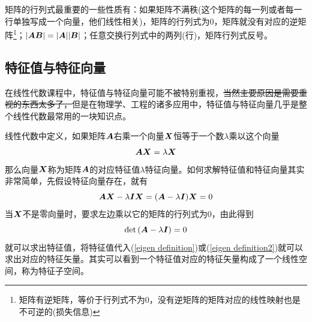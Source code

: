 \documentclass[12pt,a4paper,openany,twoside]{book}
\numberwithin{equation}{section}
\begin{document}
          矩阵的行列式最重要的一些性质有：如果矩阵不满秩(这个矩阵的每一列或者每一行单独写成一个向量，他们线性相关)，矩阵的行列式为0，矩阵就没有对应的逆矩阵\footnote{矩阵有逆矩阵，等价于行列式不为0，没有逆矩阵的矩阵对应的线性映射也是不可逆的(损失信息)}；$\abs{\vb*{A B}}=\abs{\vb*{A}}\abs{\vb*{B}}$；任意交换行列式中的两列(行)，矩阵行列式反号。

        \subsection{特征值与特征向量}
          在线性代数课程中，特征值与特征向量可能不被特别重视，\sout{当然主要原因是需要重视的东西太多了，}但是在物理学、工程的诸多应用中，特征值与特征向量几乎是整个线性代数最常用的一块知识点。

          线性代数中定义，如果矩阵$\vb*{A}$右乘一个向量$\vb*{X}$恒等于一个数$\lambda$乘以这个向量
          \begin{equation}
            \vb*{AX}=\lambda\vb*{X}
            \label{eigen definition}
          \end{equation}
          那么向量$\vb*{X}$称为矩阵$\vb*{A}$的对应特征值$\lambda$特征向量。如何求解特征值和特征向量其实非常简单，先假设特征向量存在，就有
          \begin{equation}
            \vb*{AX}-\lambda\vb*{I}\vb*{X}=\qty(\vb*{A}-\lambda\vb*{I})\vb*{X}=0
            \label{eigen definition2}
          \end{equation}
          当$\vb*{X}$不是零向量时，要求左边乘以它的矩阵的行列式为0，由此得到
          \begin{equation}
            \det\qty(\vb*{A}-\lambda\vb*{I})=0
            \label{eigen equ}
          \end{equation}
          就可以求出特征值，将特征值代入(\ref{eigen definition})或(\ref{eigen definition2})就可以求出对应的特征矢量。其实可以看到一个特征值对应的特征矢量构成了一个线性空间，称为特征子空间。
\end{document}
